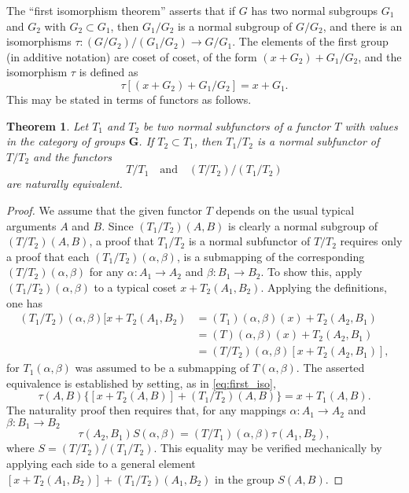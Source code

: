 \documentclass[11pt,a4paper]{report}
\newtheorem{theorem}{Theorem}
\begin{document}
The ``first isomorphism theorem'' asserts that if $G$ has two normal subgroups $G_1$ and
$G_2$ with $G_2 \subset G_1$, then $G_1/G_2$ is a normal subgroup of $G/G_2$, and there is an 
isomorphisms $\tau:(G/G_2)/(G_1/G_2)\rightarrow G/G_1$. The elements of the first group (in additive notation)
are coset of coset, of the form $(x+G_2)+G_1/G_2$, and the isomorphism $\tau$ is defined as
\begin{equation}\label{eq:first_iso}
	\tau[(x+G_2)+G_1/G_2]= x+G_1.
\end{equation}
This may be stated in terms of functors as follows.
\begin{theorem}\label{thm:first_iso_fun}
	Let $T_1$ and $T_2$ be two normal subfunctors of a functor $T$ with values in the category of groups
	$\mathbf{G}$. If $T_2\subset T_1$, then $T_1/T_2$ is a normal subfunctor of $T/T_2$ and the functors
	\begin{equation}\label{eq:grp_nateq}
		T/T_1\quad\text{and}\quad (T/T_2)/(T_1/T_2)
	\end{equation}
	are naturally equivalent.
\end{theorem}
\begin{proof}
	We assume that the given functor $T$ depends on the usual typical arguments $A$ and $B$. Since
	$(T_1/T_2)(A,B)$ is clearly a normal subgroup of $(T/T_2)(A,B)$, a proof that $T_1/T_2$ is a normal
	subfunctor of $T/T_2$ requires only a proof that each $(T_1/T_2)(\alpha,\beta)$, is a submapping of
	the corresponding $(T/T_2)(\alpha,\beta)$ for any $\alpha:A_1\rightarrow A_2$ and $\beta:B_1\rightarrow B_2$.
	To show this, apply $(T_1/T_2)(\alpha,\beta)$ to a typical coset $x+T_2(A_1,B_2)$. Applying the
	definitions, one has
	\begin{align*}
		(T_1/T_2)(\alpha,\beta)[x+T_2(A_1,B_2) &=(T_1)(\alpha,\beta)(x)+T_2(A_2,B_1)\\
						&=(T)(\alpha,\beta)(x)+T_2(A_2,B_1)\\
						&=(T/T_2)(\alpha,\beta)[x+T_2(A_2,B_1)],
	\end{align*}
	for  $T_1(\alpha,\beta)$ was assumed to be a submapping of $T(\alpha,\beta)$.
	The asserted equivalence  is established by setting, as in \cref{eq:first_iso},
	\begin{equation*}
		\tau(A,B)\{[x+T_2(A,B)]+(T_1/T_2)(A,B)\}=x+T_1(A,B).
	\end{equation*}
	The naturality proof then requires that, for any mappings $\alpha:A_1\rightarrow A_2$ and 
	$\beta:B_1\rightarrow B_2$
	\begin{equation*}
		\tau(A_2,B_1)S(\alpha,\beta)=(T/T_1)(\alpha,\beta)\tau(A_1,B_2),
	\end{equation*}
	where $S=(T/T_2)/(T_1/T_2)$. This equality may be verified mechanically by applying each side to a
	general element $[x+T_2(A_1,B_2)]+(T_1/T_2)(A_1,B_2)$ in the group $S(A,B)$.
\end{proof}
\end{document}
